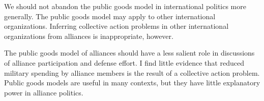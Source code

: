 \documentclass[12pt]{article}
\begin{document}
We should not abandon the public goods model in international politics more generally. 
The public goods model may apply to other international organizations. 
Inferring collective action problems in other international organizations from alliances is inappropriate, however. 


The public goods model of alliances should have a less salient role in discussions of alliance participation and defense effort. 
I find little evidence that reduced military spending by alliance members is the result of a collective action problem. 
Public goods models are useful in many contexts, but they have little explanatory power in alliance politics. 



\singlespace


  
% 
\end{document}
